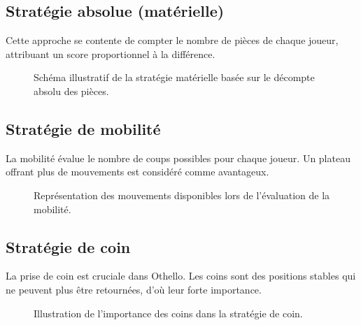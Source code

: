 \documentclass[a4paper,12pt]{article}
\begin{document}
\subsection{Stratégie absolue (matérielle)}
Cette approche se contente de compter le nombre de pièces de chaque joueur, attribuant un score proportionnel à la différence.
\begin{figure}[H]
\centering
{}
\caption{Schéma illustratif de la stratégie matérielle basée sur le décompte absolu des pièces.}
\label{fig:material}
\end{figure}

\subsection{Stratégie de mobilité}
La mobilité évalue le nombre de coups possibles pour chaque joueur. Un plateau offrant plus de mouvements est considéré comme avantageux.
\begin{figure}[H]
\centering
{}
\caption{Représentation des mouvements disponibles lors de l'évaluation de la mobilité.}
\label{fig:mobility}
\end{figure}

\subsection{Stratégie de coin}
La prise de coin est cruciale dans Othello. Les coins sont des positions stables qui ne peuvent plus être retournées, d'où leur forte importance.
\begin{figure}[H]
\centering
{}
\caption{Illustration de l'importance des coins dans la stratégie de coin.}
\label{fig:corners}
\end{figure}
\end{document}
